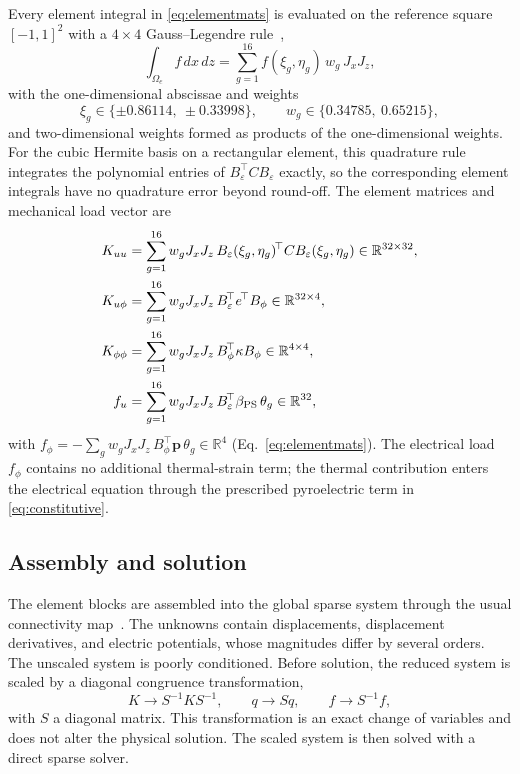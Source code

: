 \documentclass[a4paper,12pt]{elsarticle}
\begin{document}
Every element integral in \eqref{eq:elementmats} is evaluated on the reference square
$[-1,1]^2$ with a $4\times4$ Gauss--Legendre rule~\cite{AbramowitzStegun1965,Gautschi2004},
\begin{equation}
\int_{\Omega_e}f\,dx\,dz
=\sum_{g=1}^{16}f(\xi_g,\eta_g)\,w_g\,J_xJ_z,
\label{eq:quad}
\end{equation}
with the one-dimensional abscissae and weights
\begin{equation}
\xi_g\in\{\pm0.86114,\ \pm0.33998\},\qquad
w_g\in\{0.34785,\ 0.65215\},
\label{eq:gaussweights}
\end{equation}
and two-dimensional weights formed as products of the one-dimensional weights.
For the cubic Hermite basis on a rectangular element, this quadrature rule integrates
the polynomial entries of $B_\varepsilon^{\!\top}CB_\varepsilon$ exactly, so the
corresponding element integrals have no quadrature error beyond round-off. The
element matrices and mechanical load vector are
\begin{align}
K_{uu}
&=\sum_{g=1}^{16}w_gJ_xJ_z\,
B_\varepsilon(\xi_g,\eta_g)^{\!\top}C
B_\varepsilon(\xi_g,\eta_g)
\in\mathbb{R}^{32\times32},
\notag\\
K_{u\phi}
&=\sum_{g=1}^{16}w_gJ_xJ_z\,
B_\varepsilon^{\!\top}e^{\!\top}B_\phi
\in\mathbb{R}^{32\times4},
\notag\\
K_{\phi\phi}
&=\sum_{g=1}^{16}w_gJ_xJ_z\,
B_\phi^{\!\top}\kappa B_\phi
\in\mathbb{R}^{4\times4},
\notag\\
f_u
&=\sum_{g=1}^{16}w_gJ_xJ_z\,
B_\varepsilon^{\!\top}\beta_{\mathrm{PS}}\,\theta_g
\in\mathbb{R}^{32},
\label{eq:elemsums}
\end{align}
with
$f_\phi=-\sum_g w_gJ_xJ_z\,B_\phi^{\!\top}\bm p\,\theta_g\in\mathbb{R}^4$
(Eq.~\eqref{eq:elementmats}). The electrical load $f_\phi$ contains no additional
thermal-strain term; the thermal contribution enters the electrical equation through
the prescribed pyroelectric term in \eqref{eq:constitutive}.

\subsection{Assembly and solution}
\label{sec:assembly}

The element blocks are assembled into the global sparse system through the usual
connectivity map~\cite{Bathe1996}. The unknowns contain displacements, displacement
derivatives, and electric potentials, whose magnitudes differ by several orders.
The unscaled system is poorly conditioned. Before solution, the
reduced system is scaled by a diagonal congruence transformation,
\[
K\to S^{-1}KS^{-1},\qquad
q\to Sq,\qquad
f\to S^{-1}f,
\]
with $S$ a diagonal matrix. This transformation is an exact change of variables and
does not alter the physical solution. The scaled system is then solved with a direct
sparse solver.
\end{document}
